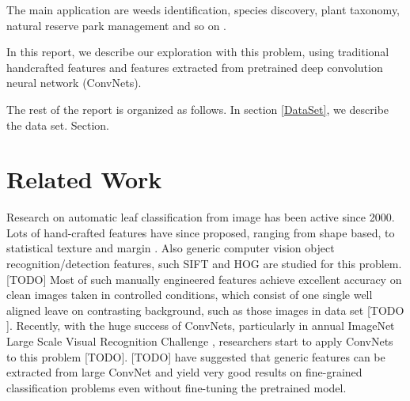 \documentclass[journal, 10pt]{IEEEtran}
\begin{document}
The main application are weeds identification, species discovery, plant taxonomy, natural reserve park management and so on \cite{Pedro13}.


In this report, we describe our exploration with this problem, using traditional handcrafted features and features extracted from pretrained deep convolution neural network (ConvNets).

The rest of the report is organized as follows. In section \ref{DataSet}, we describe the data set. Section.


\section{Related Work }
Research on automatic leaf classification from image has been active since 2000. Lots of hand-crafted features have since proposed, ranging from shape based, to statistical texture and margin \cite{Charles13} \cite{Pedro13} \cite{Cho2002}. Also generic computer vision object recognition/detection features, such SIFT and HOG are studied for this problem. [TODO]
Most of such manually engineered features achieve excellent accuracy on clean images taken in controlled conditions, which consist of one single well aligned leave on contrasting background, such as those images in data set [TODO ].
Recently, with the huge success of ConvNets, particularly in annual ImageNet Large Scale Visual Recognition Challenge \cite{Alex2014}, researchers start to apply ConvNets to this problem [TODO].  [TODO] have suggested that generic features can be extracted from large ConvNet and yield very good results on fine-grained classification problems even without fine-tuning the pretrained model.
\end{document}
